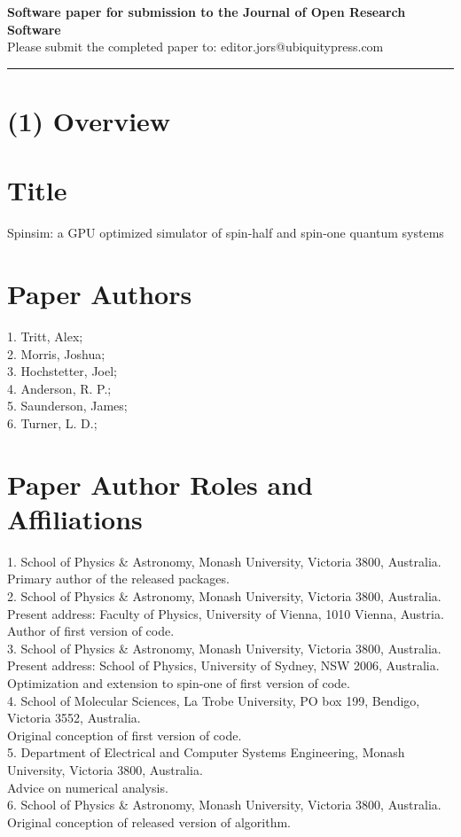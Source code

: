 \documentclass{jors}
\begin{document}
{\bf Software paper for submission to the Journal of Open Research Software} \\

Please submit the completed paper to: editor.jors@ubiquitypress.com

\rule{\textwidth}{1pt}

\section{(1) Overview}

\vspace{0.5cm}

\section{Title}
Spinsim: a GPU optimized simulator of spin-half and spin-one quantum systems

\section{Paper Authors}
1. Tritt, Alex;\\
2. Morris, Joshua;\\
3. Hochstetter, Joel;\\
4. Anderson, R. P.;\\
5. Saunderson, James;\\
6. Turner, L. D.;\\

\section{Paper Author Roles and Affiliations}
1. School of Physics \& Astronomy, Monash University, Victoria 3800, Australia.\\
	Primary author of the released packages.\\
2. School of Physics \& Astronomy, Monash University, Victoria 3800, Australia.\\
	Present address: Faculty of Physics, University of Vienna, 1010 Vienna, Austria.\\
	Author of first version of code.\\
3. School of Physics \& Astronomy, Monash University, Victoria 3800, Australia.\\
	Present address: School of Physics, University of Sydney, NSW 2006, Australia.\\
	Optimization and extension to spin-one of first version of code.\\
4. School of Molecular Sciences, La Trobe University, PO box 199, Bendigo, Victoria 3552, Australia.\\
	Original conception of first version of code.\\
5. Department of Electrical and Computer Systems Engineering, Monash University, Victoria 3800, Australia.\\
	Advice on numerical analysis.\\
6. School of Physics \& Astronomy, Monash University, Victoria 3800, Australia.\\
	Original conception of released version of algorithm.
\end{document}
